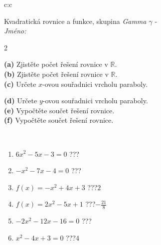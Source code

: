 \documentclass[10pt]{report}
\begin{document}
\begin{tabular}{c:c}
\begin{minipage}[c][104.5mm][t]{0.5\linewidth}
\begin{center}
\vspace{7mm}
{\huge \LARGE Kvadratická rovnice a funkce, skupina \textit{Gamma $\gamma$} -}\\[5mm]
\textit{Jméno:}\phantom{xxxxxxxxxxxxxxxxxxxxxxxxxxxxxxxxxxxxxxxxxxxxxxxxxxxxxxxxxxxxxxxxx}\\[5mm]
\begin{minipage}{0.95\linewidth}
\begin{center}
{\small \begin{multicols}{2} \raggedright
\textbf{(a)} Zjistěte počet řešení rovnice v \(\mathbb{R}\). \\[1mm]
\textbf{(b)} Zjistěte počet řešení rovnice v \(\mathbb{R}\). \\[1mm]
\textbf{(c)} Určete \(x\)-ovou souřadnici vrcholu paraboly. \par \columnbreak
\textbf{(d)} Určete \(y\)-ovou souřadnici vrcholu paraboly. \\[1mm]
\textbf{(e)} Vypočtěte součet řešení rovnice. \\[1mm]
\textbf{(f)} Vypočtěte součet řešení rovnice.
\end{multicols}
}
\end{center}
\end{minipage}
\\[4mm]
\begin{minipage}{0.79\linewidth}
\begin{center}
\begin{varwidth}{\linewidth}
\begin{enumerate}
\Large
\item $6x^2-5x-3=0$\quad \dotfill\; ???\;\dotfill {}
\item $-x^2-7x-4=0$\quad \dotfill\; ???\;\dotfill {}
\item $f(x)=-x^2+4x+3$\quad \dotfill\; ???\;\dotfill \quad $2$
\item $f(x)=2x^2-5x+1$\quad \dotfill\; ???\;\dotfill \quad $-\frac{21}{8}$
\item $-2x^2-12x-16=0$\quad \dotfill\; ???\;\dotfill {}
\item $x^2-4x+3=0$\quad \dotfill\; ???\;\dotfill \quad $4$
\end{enumerate}
\end{varwidth}
\end{center}
\end{minipage}

\end{center}
\end{minipage}
\end{tabular}
\end{document}
